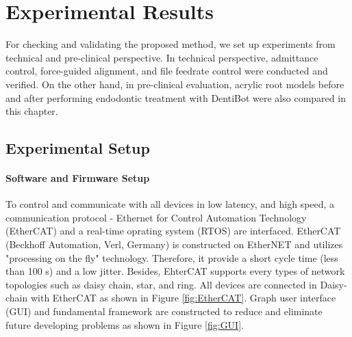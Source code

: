 \chapter{Experimental Results}
\label{chapter6}
\hspace*{6mm}For checking and validating the proposed method, we set up experiments from technical and pre-clinical perspective. In technical perspective, admittance control, force-guided alignment, and file feedrate control were conducted and verified. On the other hand, in pre-clinical evaluation, acrylic root models before and after performing endodontic treatment with DentiBot were also compared in this chapter. 
\section{Experimental Setup}
\vspace{-5mm}
\subsubsection{Software and Firmware Setup}
\vspace{-5mm}
\hspace*{6mm}To control and communicate with all devices in low latency, and high speed, a communication protocol - Ethernet for Control Automation Technology (EtherCAT) and a real-time oprating system (RTOS) are interfaced. EtherCAT (Beckhoff Automation, Verl, Germany) is constructed on EtherNET and utilizes "processing on the fly" technology. Therefore, it provide a short cycle time (less than 100 \textmu s) and a low jitter. Besides, EhterCAT supports every types of network topologies such as daisy chain, star, and ring. All devices are connected in Daisy-chain with EtherCAT as shown in Figure \ref{fig:EtherCAT}. Graph user interface (GUI) and fundamental framework are constructed to reduce and eliminate future developing problems as shown in Figure \ref{fig:GUI}.


